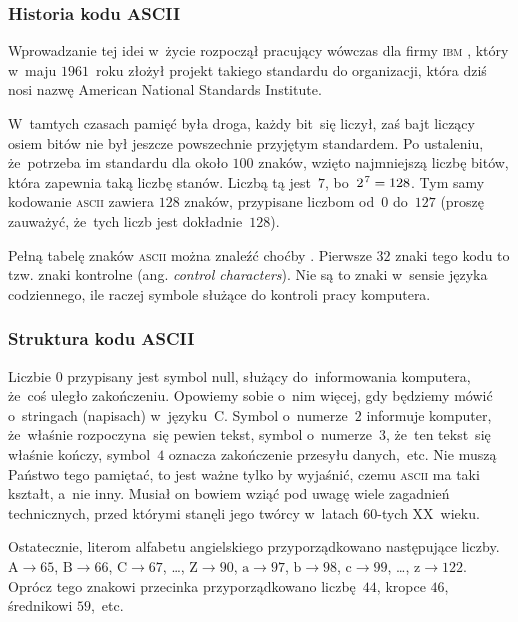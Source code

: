 \documentclass[10pt,t]{beamer}
\begin{document}
\begin{frame}
  \frametitle{Historia kodu ASCII}


  Wprowadzanie tej idei w~życie rozpoczął pracujący wówczas dla firmy
  \textsc{ibm} , który w~maju $1961$~roku złożył projekt takiego standardu
  do organizacji, która dziś nosi nazwę
  {American National Standards Institute}.

  W~tamtych czasach pamięć była droga, każdy bit~się liczył, zaś bajt liczący
  osiem bitów nie był jeszcze powszechnie przyjętym standardem. Po ustaleniu,
  że~potrzeba im standardu dla około $100$ znaków, wzięto najmniejszą
  liczbę bitów, która zapewnia taką liczbę stanów. Liczbą tą jest~$7$,
  bo~$2^{ \hspace{0.07em} 7 } = 128$. Tym samy kodowanie \textsc{ascii} zawiera
  $128$ znaków, przypisane liczbom od~$0$ do~$127$ (proszę zauważyć,
  że~tych liczb jest dokładnie~$128$).

  Pełną tabelę znaków \textsc{ascii} można znaleźć choćby
  . Pierwsze $32$ znaki tego
  kodu to tzw. znaki kontrolne (ang. \textit{control characters}). Nie są to
  znaki w~sensie języka codziennego, ile raczej symbole służące do kontroli
  pracy komputera.

\end{frame}





\begin{frame}
  \frametitle{Struktura kodu ASCII}


  Liczbie $0$ przypisany jest symbol null, służący do~informowania komputera,
  że~coś uległo zakończeniu. Opowiemy sobie o~nim więcej, gdy będziemy
  mówić o~stringach (napisach) w~języku~C. Symbol o~numerze~$2$ informuje
  komputer, że~właśnie rozpoczyna~się pewien tekst, symbol o~numerze~$3$,
  że~ten tekst~się właśnie kończy, symbol~$4$ oznacza zakończenie przesyłu
  danych,~etc. Nie muszą Państwo tego pamiętać, to jest ważne tylko by
  wyjaśnić, czemu \textsc{ascii} ma taki kształt, a~nie inny. Musiał on
  bowiem wziąć pod uwagę wiele zagadnień technicznych, przed którymi
  stanęli jego twórcy w~latach $60$-tych XX~wieku.

  Ostatecznie, literom alfabetu angielskiego przyporządkowano następujące
  liczby. $\text{A} \to 65$, $\text{B} \to 66$, $\text{C} \to 67$, \ldots,
  $\text{Z} \to 90$, $\text{a} \to 97$, $\text{b} \to 98$, $\text{c} \to 99$,
  \ldots, $\text{z} \to 122$. Oprócz tego znakowi przecinka przyporządkowano
  liczbę~$44$, kropce $46$, średnikowi $59$,~etc.

\end{frame}
\end{document}
